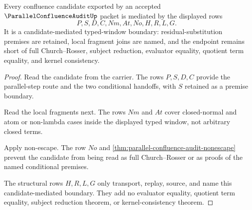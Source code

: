 \begin{theorem}
\label{thm:parallel-confluence-audit-candidate-mediated-boundary}
Every confluence candidate exported by an accepted $\ParallelConfluenceAuditUp$ packet is mediated by the displayed rows
$$
P,S,D,C,Nm,At,No,H,R,L,G .
$$
It is a candidate-mediated typed-window boundary: residual-substitution premises are retained, local fragment joins are named, and the endpoint remains short of full Church--Rosser, subject reduction, evaluator equality, quotient term equality, and kernel consistency.
\end{theorem}
\begin{proof}
Read the candidate from the carrier. The rows $P,S,D,C$ provide the parallel-step route and the two conditional handoffs, with $S$ retained as a premise boundary.

Read the local fragments next. The rows $Nm$ and $At$ cover closed-normal and atom or non-lambda cases inside the displayed typed window, not arbitrary closed terms.

Apply non-escape. The row $No$ and \autoref{thm:parallel-confluence-audit-nonescape} prevent the candidate from being read as full Church--Rosser or as proofs of the named conditional premises.

The structural rows $H,R,L,G$ only transport, replay, source, and name this candidate-mediated boundary. They add no evaluator equality, quotient term equality, subject reduction theorem, or kernel-consistency theorem.
\end{proof}


\begin{closurestatus}{\ParallelConfluenceAuditUp}
  \theoryclosure{\seedClosure}
  \formalstatus{\unformalizedV}
\end{closurestatus}
